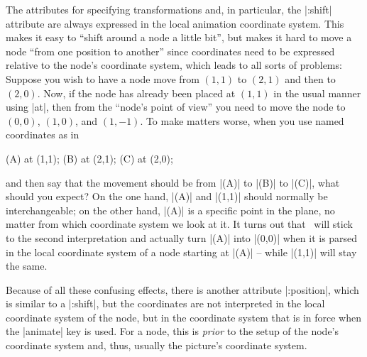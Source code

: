 The attributes for specifying transformations and, in particular, the |:shift|
attribute are always expressed in the local animation coordinate system. This
makes it easy to ``shift around a node a little bit'', but makes it hard to
move a node ``from one position to another'' since coordinates need to be
expressed relative to the node's coordinate system, which leads to all sorts of
problems: Suppose you wish to have a node move from $(1,1)$ to $(2,1)$ and then
to $(2,0)$. Now, if the node has already been placed at $(1,1)$ in the usual
manner using |at|, then from the ``node's point of view'' you need to move the
node to $(0,0)$, $(1,0)$, and $(1,-1)$. To make matters worse, when you use
named coordinates as in
%
\begin{codeexample}
\coordinate(A) at (1,1);
\coordinate(B) at (2,1);
\coordinate(C) at (2,0);
\end{codeexample}
%
and then say that the movement should be from |(A)| to |(B)| to |(C)|, what
should you expect? On the one hand, |(A)| and |(1,1)| should normally be
interchangeable; on the other hand, |(A)| is a specific point in the plane, no
matter from which coordinate system we look at it. It turns out that \tikzname\
will stick to the second interpretation and actually turn |(A)| into |(0,0)|
when it is parsed in the local coordinate system of a node starting at |(A)| --
while |(1,1)| will stay the same.

Because of all these confusing effects, there is another attribute |:position|,
which is similar to a |:shift|, but the coordinates are not interpreted in the
local coordinate system of the node, but in the coordinate system that is in
force when the |animate| key is used. For a node, this is \emph{prior} to the
setup of the node's coordinate system and, thus, usually the picture's
coordinate system.

